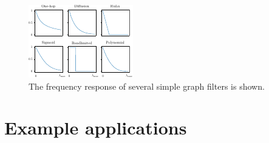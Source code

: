 \begin{figure}[t]
	\centering
		\includegraphics[width=0.7\linewidth]{Figures/filters_plot.pdf}
        \caption[The frequency response of some simple graphs filters]{The frequency response of several simple graph filters is shown. }
	\label{fig:filters_plot}
\end{figure}






\newpage

\section{Example applications}


